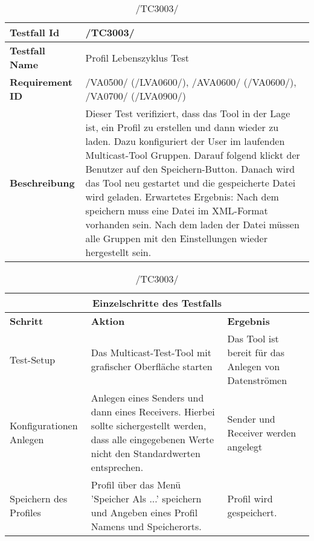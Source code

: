 \begin{table}[h]
        \caption{/TC3003/}
        \label{tab:TC3003}
        \begin{center}
            \begin{tabular}{|p{3.5cm}|p{12cm}|}
                \hline
                    \textbf{Testfall Id} & /TC3003/\\
                \hline
                    \textbf{Testfall Name} & Profil Lebenszyklus Test\\
                \hline
                    \textbf{Requirement ID} & /VA0500/ (/LVA0600/), /AVA0600/ (/VA0600/), /VA0700/ (/LVA0900/)\\
                \hline
                    \textbf{Beschreibung} & Dieser Test verifiziert, dass das
                    Tool in der Lage ist, ein Profil zu erstellen und dann wieder
                    zu laden. Dazu konfiguriert der User im laufenden Multicast-Tool Gruppen. Darauf folgend klickt der Benutzer auf den Speichern-Button. Danach wird das Tool neu gestartet und
die gespeicherte Datei wird geladen. Erwartetes Ergebnis:
Nach dem speichern muss eine Datei im XML-Format vorhanden sein. Nach dem laden
der Datei müssen alle Gruppen mit den Einstellungen wieder hergestellt sein.\\
                \hline
            \end{tabular}
            \begin{tabular}{|p{3.5cm}|p{5cm}|p{6.55cm}|}
                \multicolumn{3}{|c|}{\textbf{Einzelschritte des Testfalls}} \\
                \hline
                    \textbf{Schritt} & \textbf{Aktion} & \textbf{Ergebnis}\\
                \hline
                    Test-Setup &
                    Das Multicast-Test-Tool mit grafischer Oberfläche starten & 
                    Das Tool ist bereit für das Anlegen von Datenströmen \\
                \hline
                    Konfigurationen Anlegen &
                    Anlegen eines Senders und dann eines Receivers.
                    Hierbei sollte sichergestellt werden, dass alle eingegebenen
                    Werte nicht den Standardwerten entsprechen. &
                    Sender und Receiver werden angelegt \\
                \hline
                    Speichern des Profiles & 
                    Profil über das Menü 'Speicher Als ...' speichern und Angeben eines 
                    Profil Namens und Speicherorts. & Profil wird gespeichert.

\end{tabular}
\end{center}
\end{table}
